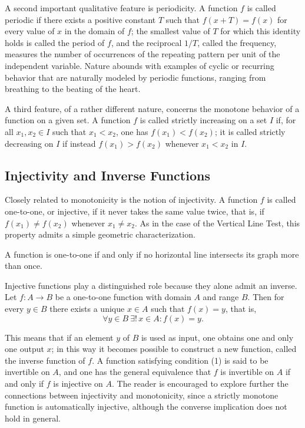 A second important qualitative feature is periodicity. A function $f$ is called periodic if there exists a positive constant $T$ such that $f(x + T) = f(x)$ for every value of $x$ in the domain of $f$; the smallest value of $T$ for which this identity holds is called the period of $f$, and the reciprocal $1/T$, called the frequency, measures the number of occurrences of the repeating pattern per unit of the independent variable. Nature abounds with examples of cyclic or recurring behavior that are naturally modeled by periodic functions, ranging from breathing to the beating of the heart.

A third feature, of a rather different nature, concerns the monotone behavior of a function on a given set. A function $f$ is called strictly increasing on a set $I$ if, for all $x_1, x_2 \in I$ such that $x_1 < x_2$, one has $f(x_1) < f(x_2)$; it is called strictly decreasing on $I$ if instead $f(x_1) > f(x_2)$ whenever $x_1 < x_2$ in $I$.

\subsection{Injectivity and Inverse Functions}

Closely related to monotonicity is the notion of injectivity. A function $f$ is called one-to-one, or injective, if it never takes the same value twice, that is, if $f(x_1) \neq f(x_2)$ whenever $x_1 \neq x_2$. As in the case of the Vertical Line Test, this property admits a simple geometric characterization.

\begin{theorem}
A function is one-to-one if and only if no horizontal line intersects its graph more than once.
\end{theorem}

Injective functions play a distinguished role because they alone admit an inverse. Let $f : A \to B$ be a one-to-one function with domain $A$ and range $B$. Then for every $y \in B$ there exists a unique $x \in A$ such that $f(x) = y$, that is,
\begin{equation*}
\forall y \in B \ \exists! \, x \in A : f(x) = y. \tag{1}
\end{equation*}

This means that if an element $y$ of $B$ is used as input, one obtains one and only one output $x$; in this way it becomes possible to construct a new function, called the inverse function of $f$. A function satisfying condition (1) is said to be invertible on $A$, and one has the general equivalence that $f$ is invertible on $A$ if and only if $f$ is injective on $A$. The reader is encouraged to explore further the connections between injectivity and monotonicity, since a strictly monotone function is automatically injective, although the converse implication does not hold in general.

